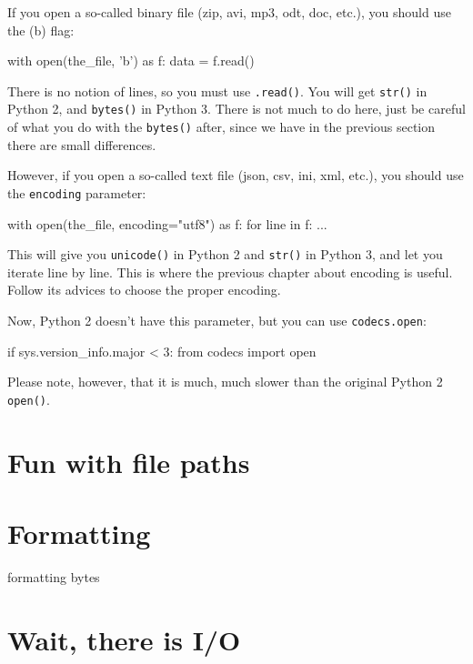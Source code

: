 If you open a so-called binary file (zip, avi, mp3, odt, doc, etc.), you should use the \textquote(b) flag:

\begin{py2and3}
with open(the_file, 'b') as f:
    data = f.read()
\end{py2and3}

There is no notion of lines, so you must use \lstinline{.read()}. You will get \lstinline{str()} in Python 2, and \lstinline{bytes()} in Python 3. There is not much to do here, just be careful of what you do with the \lstinline{bytes()} after, since we have in the previous section there are small differences.

However, if you open a so-called text file (json, csv, ini, xml, etc.), you should use the \lstinline{encoding} parameter:

\begin{py3}
with open(the_file, encoding="utf8") as f:
    for line in f:
        ...
\end{py3}

This will give you \lstinline{unicode()} in Python 2 and \lstinline{str()} in Python 3, and let you iterate line by line. This is where the previous chapter about encoding is useful. Follow its advices to choose the proper encoding.

Now, Python 2 doesn't have this parameter, but you can use \lstinline{codecs.open}:

\begin{py2and3}
if sys.version_info.major < 3:
    from codecs import open
\end{py2and3}

Please note, however, that it is much, much slower than the original Python 2 \lstinline{open()}.







\section{Fun with file paths}

\section{Formatting}


formatting bytes

\section{Wait, there is I/O}

